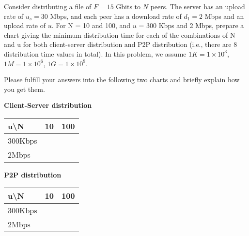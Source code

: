 \documentclass{report}
\begin{document}
\newpage
\begin{problem}
	Consider distributing a file of $F = 15$ Gbits to $N$ peers.
	The server has an upload rate of $u_s = 30$ Mbps, and each peer has a download rate of $d_1 = 2$ Mbps and an upload rate of $u$.
	For N = 10 and 100, and $u$ = 300 Kbps and 2 Mbps, prepare a chart giving the minimum distribution time for each of the combinations of N and u for both client-server distribution and P2P distribution (i.e., there are 8 distribution time values in total).
	In this problem, we assume $1K = 1 \times 10^3$, $1M = 1 \times 10^6$, $1G = 1 \times 10^9$.


	Please fulfill your answers into the following two charts and briefly explain how you get them.

	\begin{answer}{40em}

		\begin{center}
			\normalsize
			\textbf{Client-Server distribution} \\
			\vspace{0.2cm}
			\begin{tabular}{ | m{2cm} || m{4.5cm} | m{4.5cm} |}
				\hline
				u\textbackslash N & 10 & 100 \\
				\hline
				\hline
				300Kbps &   &   \\
				\hline
				2Mbps &   &   \\
				\hline
			\end{tabular}
		\end{center}

		\begin{center}
			\normalsize
			\textbf{P2P distribution} \\
			\vspace{0.2cm}
			\begin{tabular}{ | m{2cm} || m{4.5cm} | m{4.5cm} |}
				\hline
				u\textbackslash N & 10 & 100 \\
				\hline
				\hline
				300Kbps &   &   \\
				\hline
				2Mbps &   &   \\
				\hline
			\end{tabular}
		\end{center}
	\end{answer}

\end{problem}
\end{document}

